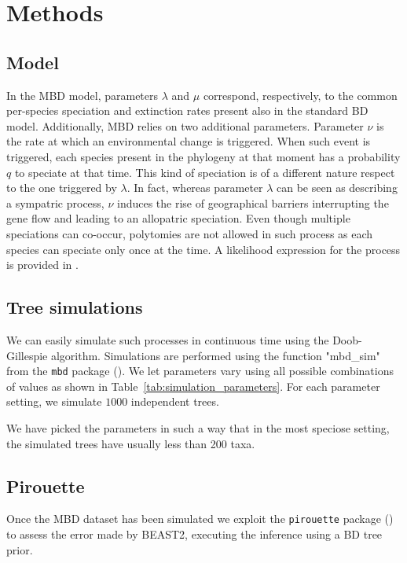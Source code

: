 \section{Methods}

\subsection{Model}

In the MBD model, parameters $\lambda$ and $\mu$ correspond, respectively, 
to the common per-species speciation and extinction rates present 
also in the standard BD model. 
Additionally, MBD relies on two additional parameters. 
Parameter $\nu$ is the rate at which an environmental change is triggered.
When such event is triggered, each species present in the phylogeny at that 
moment has a probability $q$ to speciate at that time.
This kind of speciation is of a different nature respect to the one triggered 
by $\lambda$. In fact, whereas parameter $\lambda$ can be seen as describing 
a sympatric process, $\nu$ induces the rise of geographical barriers 
interrupting the gene flow and leading to an allopatric speciation.
Even though multiple speciations can co-occur, polytomies are not allowed 
in such process as each species can speciate only once at the time.
A likelihood expression for the process is provided in \cite{mbd}.

\subsection{Tree simulations}

We can easily simulate such processes in continuous time using the 
Doob-Gillespie algorithm. Simulations are performed using the 
function "mbd\_sim" from the \verb;mbd; package (\citep{mbd}).
We let parameters vary using all possible combinations of values
as shown in Table~\ref{tab:simulation_parameters}.
For each parameter setting, we simulate $1000$ independent trees.

We have picked the parameters in such a way that in the most speciose
setting, the simulated trees have usually less than 200 taxa.



\subsection{Pirouette}

Once the MBD dataset has been simulated we exploit the \verb;pirouette; 
package (\citep{pirouette}) to assess the error made by BEAST2, executing 
the inference using a BD tree prior.

